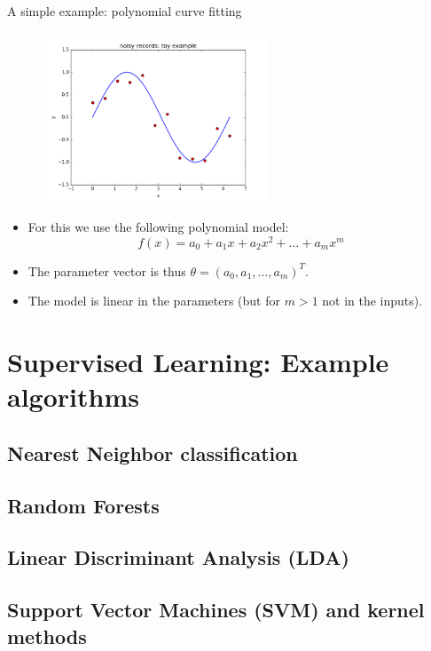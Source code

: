 \documentclass[xcolor=pdftex,dvipsnames,table]{beamer}
\begin{document}
\begin{frame}{A simple example: polynomial curve fitting}
\begin{figure}[htb]
\includegraphics[width=0.6\textwidth]{../graphics/sample_from_sin.png}
\end{figure}
\begin{itemize}
	\item For this we use the following polynomial model:
	\begin{equation}
	f(x) = a_0 + a_1 x + a_2 x^2 + \ldots + a_m x^m
	\end{equation}
	\item The parameter vector is thus $\theta = (a_0, a_1, \ldots, a_m)^T$. 
	\item The model is linear in the parameters (but for $m>1$ not in the inputs). 
\end{itemize}
\end{frame}


\section{Supervised Learning: Example algorithms}
\subsection{Nearest Neighbor classification}
\subsection{Random Forests}
\subsection{Linear Discriminant Analysis (LDA)}
\subsection{Support Vector Machines (SVM) and kernel methods}
\end{document}
